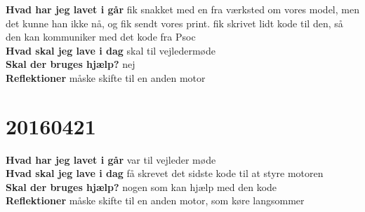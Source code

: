 \documentclass{article}
\begin{document}
\textbf{Hvad har jeg lavet i går}
fik snakket med en fra værksted om vores model, men det kunne han ikke nå, og fik sendt vores print. fik skrivet lidt kode til den, så den kan kommuniker med det kode fra Psoc
\\
\textbf{Hvad skal jeg lave i dag}
skal til vejledermøde
\\
\textbf{Skal der bruges hjælp?}
nej
\\
\textbf{Reflektioner}
måske skifte til en anden motor

\section{20160421}

\textbf{Hvad har jeg lavet i går}
var til vejleder møde
\\
\textbf{Hvad skal jeg lave i dag}
få skrevet det sidste kode til at styre motoren 
\\
\textbf{Skal der bruges hjælp?}
nogen som kan hjælp med den kode
\\
\textbf{Reflektioner}
måske skifte til en anden motor, som køre langsommer						
\end{document}

